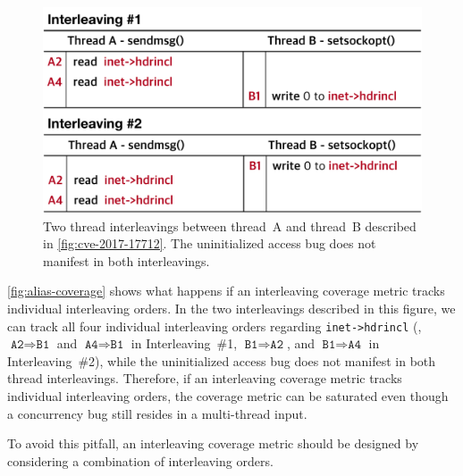 \begin{figure}[t]
  \centering
  \includegraphics[width=0.90\linewidth]{fig/alias-coverage.pdf}
  \caption{Two thread interleavings between thread~A and thread~B
    described in \autoref{fig:cve-2017-17712}. The uninitialized
    access bug does not manifest in both interleavings.}
  \label{fig:alias-coverage}
\end{figure}
%
\autoref{fig:alias-coverage} shows what happens if an interleaving
coverage metric tracks individual interleaving orders.
%
In the two interleavings described in this figure, we can track all
four individual interleaving orders regarding \texttt{inet->hdrincl}
(\ie, $\texttt{A2} \Rightarrow \texttt{B1}$ and
$\texttt{A4} \Rightarrow \texttt{B1}$ in Interleaving~\#1,
$\texttt{B1} \Rightarrow \texttt{A2}$, and
$\texttt{B1} \Rightarrow \texttt{A4}$ in Interleaving~\#2), while the
uninitialized access bug does not manifest in both thread
interleavings.
%
Therefore, if an interleaving coverage metric tracks individual
interleaving orders, the coverage metric can be saturated even though
a concurrency bug still resides in a multi-thread input.

To avoid this pitfall, an interleaving coverage metric should be
designed by considering a combination of interleaving orders.





